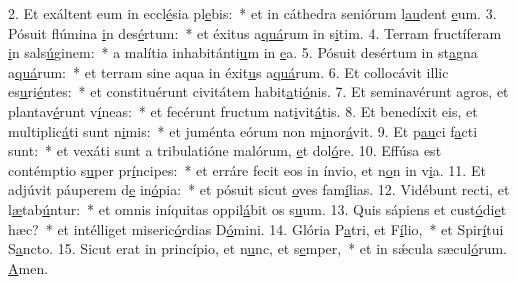 2. Et exáltent eum in eccl\uline{é}sia pl\uline{e}bis:~* et in cáthedra seniórum l\uline{au}dent \uline{e}um.
3. Pósuit flúmina \uline{i}n des\uline{é}rtum:~* et éxitus a\uline{quá}rum in s\uline{i}tim.
4. Terram fructíferam \uline{i}n sals\uline{ú}ginem:~* a malítia inhabitánti\uline{u}m in \uline{e}a.
5. Pósuit desértum in st\uline{a}gna a\uline{quá}rum:~* et terram sine aqua in éxit\uline{u}s a\uline{quá}rum.
6. Et collocávit illic es\uline{u}ri\uline{é}ntes:~* et constituérunt civitátem habit\uline{a}ti\uline{ó}nis.
7. Et seminavérunt agros, et plantav\uline{é}runt v\uline{í}neas:~* et fecérunt fructum nat\uline{i}vit\uline{á}tis.
8. Et benedíxit eis, et multiplic\uline{á}ti sunt n\uline{i}mis:~* et juménta eórum non m\uline{i}nor\uline{á}vit.
9. Et p\uline{au}ci f\uline{a}cti sunt:~* et vexáti sunt a tribulatióne malórum, \uline{e}t dol\uline{ó}re.
10. Effúsa est contémptio s\uline{u}per pr\uline{í}ncipes:~* et erráre fecit eos in ínvio, et n\uline{o}n in v\uline{i}a.
11. Et adjúvit páuperem d\uline{e} in\uline{ó}pia:~* et pósuit sicut \uline{o}ves fam\uline{í}lias.
12. Vidébunt recti, et l\uline{æ}tab\uline{ú}ntur:~* et omnis iníquitas oppil\uline{á}bit os s\uline{u}um.
13. Quis sápiens et cust\uline{ó}di\uline{e}t hæc?~* et intélliget miseric\uline{ó}rdias D\uline{ó}mini.
14. Glória P\uline{a}tri, et F\uline{í}lio,~* et Spir\uline{í}tui S\uline{a}ncto.
15. Sicut erat in princípio, et n\uline{u}nc, et s\uline{e}mper,~* et in sǽcula sæcul\uline{ó}rum. \uline{A}men.
